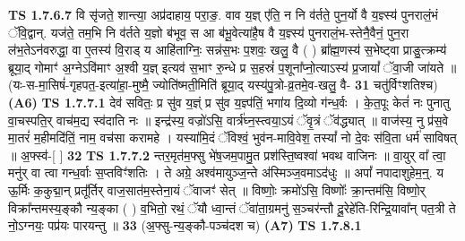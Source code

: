 \documentclass[17pt]{extarticle}
\begin{document}
                  \newline
                                \textbf{ TS 1.7.6.7} \newline
                  वि सृ॑जते॒ शान्त्या॒ अप्र॑दाहाय॒ परा॒ङ॒. वाव य॒ज्ञ् ए॑ति॒ न नि व॑र्तते॒ पुन॒र्यो वै य॒ज्ञ्स्य॑ पुनरालं॒भं ॅवि॒द्वान्. यज॑ते॒ तम॒भि नि व॑र्तते य॒ज्ञो ब॑भूव॒ स आ ब॑भू॒वेत्या॑है॒ष वै य॒ज्ञ्स्य॑ पुनरालं॒भ-स्तेनै॒वैनं॒ पुन॒रा ल॑भ॒तेऽन॑वरुद्धा॒ वा ए॒तस्य॑ वि॒राड् य आहि॑ताग्निः॒ सन्न॑स॒भः प॒शवः॒ खलु॒ वै ( ) ब्रा᳚ह्म॒णस्य॑ स॒भेष्ट्वा प्राङु॒त्क्रम्य॑ ब्रूया॒द् गोमाꣳ॑ अ॒ग्नेऽवि॑माꣳ अ॒श्वी य॒ज्ञ् इत्यव॑ स॒भाꣳ रु॒न्धे प्र स॒हस्रं॑ प॒शूना᳚प्नो॒त्याऽस्य॑ प्र॒जायां᳚ ॅवा॒जी जा॑यते ॥(यः-स-मा॒सिषं॑-गृहपत॒-इत्या॑हा॒-मुष्मै॒ ज्योति॑ष्मती॒मिति॑ ब्रूया॒द् यस्य॑पु॒त्रो-व्र॒तमे॒व-खलु॒ वै- \textbf{  31} \newline
                  \newline
                      चतु॑र्विꣳशतिश्च)  \textbf{(A6)} \newline \newline
                                        \textbf{ TS 1.7.7.1} \newline
                  देव॑ सवितः॒ प्र सु॑व य॒ज्ञ्ं प्र सु॑व य॒ज्ञ्प॑तिं॒ भगा॑य दि॒व्यो ग॑न्ध॒र्वः । के॒त॒पूः केतं॑ नः पुनातु वा॒चस्पति॒र् वाच॑म॒द्य स्व॑दाति नः ॥ इन्द्र॑स्य॒ वज्रो॑ऽसि॒ वार्त्र॑घ्न॒स्त्वया॒ऽयं ॅवृ॒त्रं ॅव॑द्ध्यात् ॥ वाज॑स्य॒ नु प्र॑स॒वे मा॒तरं॑ म॒हीमदि॑तिं॒ नाम॒ वच॑सा करामहे । यस्या॑मि॒दं ॅविश्वं॒ भुव॑न-मावि॒वेश॒ तस्यां᳚ नो दे॒वः स॑वि॒ता धर्म॑ साविषत् ॥ अ॒फ्स्व॑-[ ] \textbf{  32} \newline
                  \newline
                                \textbf{ TS 1.7.7.2} \newline
                  न्तर॒मृत॑म॒फ्सु भे॑ष॒जम॒पामु॒त प्रश॑स्ति॒ष्वश्वा॑ भवथ वाजिनः ॥ वा॒युर् वा᳚ त्वा॒ मनु॑र् वा त्वा गन्ध॒र्वाः स॒प्तविꣳ॑शतिः । ते अग्रे॒ अश्व॑मायुञ्ज॒न्ते अ॑स्मिञ्ज॒वमाऽद॑धुः ॥ अपां᳚ नपादाशुहेम॒न्॒. य ऊ॒र्मिः क॒कुद्मा॒न् प्रतू᳚र्तिर् वाज॒सात॑म॒स्तेना॒यं ॅवाजꣳ॑ सेत् ॥ विष्णोः॒ क्रमो॑ऽसि॒ विष्णोः᳚ क्रा॒न्तम॑सि॒ विष्णो॒र् विक्रा᳚न्तमस्य॒ङ्कौ न्य॒ङ्का ( ) व॒भितो॒ रथं॒ ॅयौ ध्वा॒न्तं ॅवा॑ता॒ग्रमनु॑ स॒ञ्चर॑न्तौ दू॒रेहे॑ति-रिन्द्रि॒यावा᳚न् पत॒त्री ते नो॒ऽग्नयः॒ पप्र॑यः पारयन्तु ॥ \textbf{  33} \newline
                  \newline
                      (अ॒फ्सु-न्य॒ङ्कौ-पञ्च॑दश च)  \textbf{(A7)} \newline \newline
                                        \textbf{ TS 1.7.8.1} \newline
\end{document}
